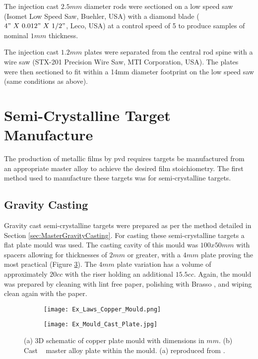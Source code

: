 The injection cast $2.5mm$ diameter rods were sectioned on a low speed saw (Isomet Low Speed Saw, Buehler, USA) with a diamond blade ($4"~ X~ 0.012"~ X~ 1/2"$, Leco, USA) at a control speed of 5 to produce samples of nominal $1mm$ thickness. 

The injection cast $1.2mm$ plates were separated from the central rod spine with a wire saw (STX-201 Precision Wire Saw, MTI Corporation, USA). The plates were then sectioned to fit within a 14mm diameter footprint on the low speed saw (same conditions as above). 

\section{Semi-Crystalline Target Manufacture} 
The production of metallic films by \gls{pvd} requires targets be manufactured from an appropriate master alloy to achieve the desired film stoichiometry. The first method used to manufacture these targets was for semi-crystalline targets.

\subsection{Gravity Casting}
Gravity cast semi-crystalline targets were prepared as per the method detailed in Section \ref{sec:MasterGravityCasting}. For casting these semi-crystalline targets a flat plate mould was used. The casting cavity of this mould was $100 x 50 mm$ with spacers allowing for thicknesses of $2 mm$ or greater, with a $4 mm$ plate proving the most practical (Figure \ref{fig:PlateMould}). The $4 mm$ plate variation has a volume of approximately $20 cc$ with the riser holding an additional $15.5 cc$. Again, the mould was prepared by cleaning with lint free paper, polishing with Brasso \textcopyright, and wiping clean again with the paper.

\begin{figure}[htbp]
	\begin{subfigure}[htbp]{0.41\textwidth}
		\texttt{[image: Ex\_Laws\_Copper\_Mould.png]}
		\caption{}
		\label{fig:LawsMould}
	\end{subfigure}
	\begin{subfigure}[htbp]{0.49\textwidth}
		\texttt{[image: Ex\_Mould\_Cast\_Plate.jpg]}
		\caption{}
		\label{fig:FilledMould}
	\end{subfigure}
	\caption[(a) 3D schematic of copper plate mould with dimensions in $mm$. (b) Cast \MgZnCa~ master alloy plate within the mould.]{(a) 3D schematic of copper plate mould with dimensions in $mm$. (b) Cast \MgZnCa~ master alloy plate within the mould. (a) reproduced from \cite{Laws2007}.}%
	\label{fig:PlateMould}
\end{figure}

